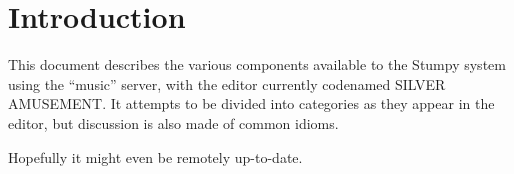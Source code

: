 \section{Introduction}
This document describes the various components available to the
Stumpy system using the ``music'' server, with the editor currently
codenamed SILVER AMUSEMENT. It attempts to be divided into categories
as they appear in the editor, but discussion is also made of common
idioms.

Hopefully it might even be remotely up-to-date.




